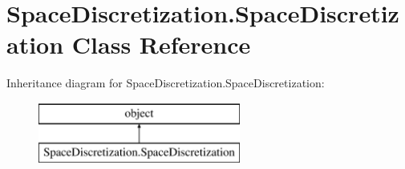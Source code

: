 \hypertarget{class_space_discretization_1_1_space_discretization}{}\section{Space\+Discretization.\+Space\+Discretization Class Reference}
\label{class_space_discretization_1_1_space_discretization}
Inheritance diagram for Space\+Discretization.\+Space\+Discretization\+:\begin{figure}[H]
\begin{center}
\leavevmode
\includegraphics[height=2.000000cm]{class_space_discretization_1_1_space_discretization}
\end{center}
\end{figure}
